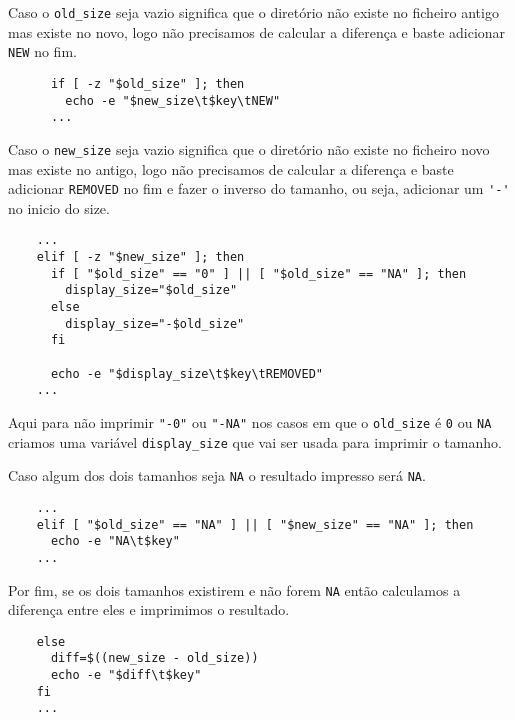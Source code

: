 Caso o \Verb|old_size| seja vazio significa que o diretório não existe no ficheiro antigo mas existe no novo, logo não precisamos de calcular a diferença e baste adicionar \Verb|NEW| no fim.

\begin{listing}[H]
  \begin{verbatim}
      if [ -z "$old_size" ]; then
        echo -e "$new_size\t$key\tNEW"
      ...
  \end{verbatim}
\end{listing}

Caso o \Verb|new_size| seja vazio significa que o diretório não existe no ficheiro novo mas existe no antigo, logo não precisamos de calcular a diferença e baste adicionar \Verb|REMOVED| no fim e fazer o inverso do tamanho, ou seja, adicionar um \Verb|'-'| no inicio do size.

\begin{listing}[H]
  \begin{verbatim}
    ...
    elif [ -z "$new_size" ]; then
      if [ "$old_size" == "0" ] || [ "$old_size" == "NA" ]; then
        display_size="$old_size"
      else
        display_size="-$old_size"
      fi

      echo -e "$display_size\t$key\tREMOVED"
    ...
  \end{verbatim}
\end{listing}

Aqui para não imprimir \Verb|"-0"| ou \Verb|"-NA"| nos casos em que o \Verb|old_size| é \Verb|0| ou \Verb|NA| criamos uma variável \Verb|display_size| que vai ser usada para imprimir o tamanho.

Caso algum dos dois tamanhos seja \Verb|NA| o resultado impresso será \Verb|NA|.

\begin{listing}[H]
  \begin{verbatim}
    ...
    elif [ "$old_size" == "NA" ] || [ "$new_size" == "NA" ]; then
      echo -e "NA\t$key"
    ...
  \end{verbatim}
\end{listing}

Por fim, se os dois tamanhos existirem e não forem \Verb|NA| então calculamos a diferença entre eles e imprimimos o resultado.

\begin{listing}[H]
  \begin{verbatim}
    else
      diff=$((new_size - old_size))
      echo -e "$diff\t$key"
    fi
    ...
  \end{verbatim}
\end{listing}


